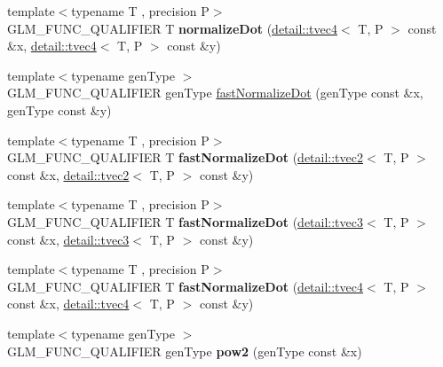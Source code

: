 \begin{DoxyCompactItemize}
\item 
{\footnotesize template$<$typename T , precision P$>$ }\\G\+L\+M\+\_\+\+F\+U\+N\+C\+\_\+\+Q\+U\+A\+L\+I\+F\+I\+ER T {\bfseries normalize\+Dot} (\hyperlink{structglm_1_1detail_1_1tvec4}{detail\+::tvec4}$<$ T, P $>$ const \&x, \hyperlink{structglm_1_1detail_1_1tvec4}{detail\+::tvec4}$<$ T, P $>$ const \&y)\hypertarget{namespaceglm_a763d17f02acc109bf9818eb8048ce699}{}\label{namespaceglm_a763d17f02acc109bf9818eb8048ce699}

\item 
{\footnotesize template$<$typename gen\+Type $>$ }\\G\+L\+M\+\_\+\+F\+U\+N\+C\+\_\+\+Q\+U\+A\+L\+I\+F\+I\+ER gen\+Type \hyperlink{group__gtx__normalize__dot_gaeb26ec35a51c30dbd0d91f9da45eeafe}{fast\+Normalize\+Dot} (gen\+Type const \&x, gen\+Type const \&y)
\item 
{\footnotesize template$<$typename T , precision P$>$ }\\G\+L\+M\+\_\+\+F\+U\+N\+C\+\_\+\+Q\+U\+A\+L\+I\+F\+I\+ER T {\bfseries fast\+Normalize\+Dot} (\hyperlink{structglm_1_1detail_1_1tvec2}{detail\+::tvec2}$<$ T, P $>$ const \&x, \hyperlink{structglm_1_1detail_1_1tvec2}{detail\+::tvec2}$<$ T, P $>$ const \&y)\hypertarget{namespaceglm_ab3e920221404490d3c2bf00ba18ed132}{}\label{namespaceglm_ab3e920221404490d3c2bf00ba18ed132}

\item 
{\footnotesize template$<$typename T , precision P$>$ }\\G\+L\+M\+\_\+\+F\+U\+N\+C\+\_\+\+Q\+U\+A\+L\+I\+F\+I\+ER T {\bfseries fast\+Normalize\+Dot} (\hyperlink{structglm_1_1detail_1_1tvec3}{detail\+::tvec3}$<$ T, P $>$ const \&x, \hyperlink{structglm_1_1detail_1_1tvec3}{detail\+::tvec3}$<$ T, P $>$ const \&y)\hypertarget{namespaceglm_a6a98cf963739276c2f766c34bb531bf5}{}\label{namespaceglm_a6a98cf963739276c2f766c34bb531bf5}

\item 
{\footnotesize template$<$typename T , precision P$>$ }\\G\+L\+M\+\_\+\+F\+U\+N\+C\+\_\+\+Q\+U\+A\+L\+I\+F\+I\+ER T {\bfseries fast\+Normalize\+Dot} (\hyperlink{structglm_1_1detail_1_1tvec4}{detail\+::tvec4}$<$ T, P $>$ const \&x, \hyperlink{structglm_1_1detail_1_1tvec4}{detail\+::tvec4}$<$ T, P $>$ const \&y)\hypertarget{namespaceglm_a3dec6f079e401edfcf637fa8b89e7c92}{}\label{namespaceglm_a3dec6f079e401edfcf637fa8b89e7c92}

\item 
{\footnotesize template$<$typename gen\+Type $>$ }\\G\+L\+M\+\_\+\+F\+U\+N\+C\+\_\+\+Q\+U\+A\+L\+I\+F\+I\+ER gen\+Type {\bfseries pow2} (gen\+Type const \&x)\hypertarget{namespaceglm_a21d473793b5c7308fa14176d24f6061f}{}\label{namespaceglm_a21d473793b5c7308fa14176d24f6061f}


\end{DoxyCompactItemize}
